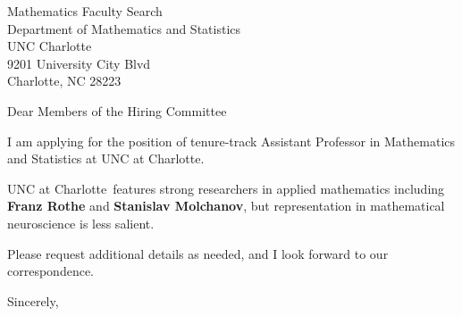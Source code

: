 




	
	
	\def\School{UNC at Charlotte}
	
	\begin{letter}
		{Mathematics Faculty Search\\
		Department of Mathematics and Statistics\\
		UNC Charlotte\\
		9201 University City Blvd\\
		Charlotte, NC 28223
		}
		
		\opening{Dear Members of the Hiring Committee}
		
		
		I am applying for the position of tenure-track Assistant Professor in Mathematics and Statistics at \School. 
		
		\School~features strong researchers in applied mathematics including \textbf{Franz Rothe} and \textbf{Stanislav Molchanov}, but representation in mathematical neuroscience is less salient.  
		
		
		
		
		
		Please request additional details as needed, and I look forward to our correspondence.
		
		\closing{Sincerely,}
	\end{letter}
